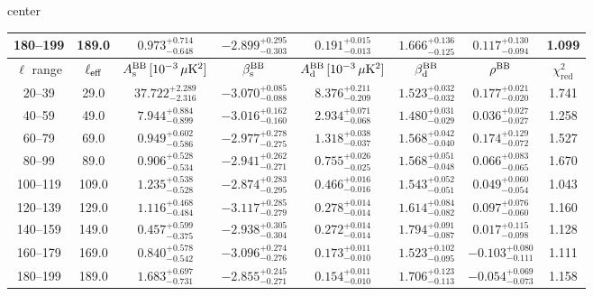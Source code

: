 \begin{table}[h]
\begin{adjustbox}{center}
\begin{tabular}{cccccccc}
180--199 & 189.0 & $0.973^{+0.714}_{-0.648}$ & $-2.899^{+0.295}_{-0.303}$ & $0.191^{+0.015}_{-0.013}$ & $1.666^{+0.136}_{-0.125}$ & $0.117^{+0.130}_{-0.094}$ & 1.099 \\
\midrule
$\ell$ range & $\ell_{\rm eff}$ & $A^{\rm BB}_{\rm s}\,[10^{-3}\,\mu\mathrm{K}^2]$ & $\beta^{\rm BB}_{\rm s}$ & $A^{\rm BB}_{\rm d}\,[10^{-3}\,\mu\mathrm{K}^2]$ & $\beta^{\rm BB}_{\rm d}$ & $\rho^{\rm BB}$ & $\chi^2_\mathrm{red}$ \\
\midrule
20--39 & 29.0 & $37.722^{+2.289}_{-2.316}$ & $-3.070^{+0.085}_{-0.088}$ & $8.376^{+0.211}_{-0.209}$ & $1.523^{+0.032}_{-0.032}$ & $0.177^{+0.021}_{-0.020}$ & 1.741 \\
40--59 & 49.0 & $7.944^{+0.884}_{-0.899}$ & $-3.016^{+0.162}_{-0.160}$ & $2.934^{+0.071}_{-0.068}$ & $1.480^{+0.031}_{-0.029}$ & $0.036^{+0.027}_{-0.027}$ & 1.258 \\
60--79 & 69.0 & $0.949^{+0.602}_{-0.586}$ & $-2.977^{+0.278}_{-0.275}$ & $1.318^{+0.038}_{-0.037}$ & $1.568^{+0.042}_{-0.040}$ & $0.174^{+0.129}_{-0.072}$ & 1.527 \\
80--99 & 89.0 & $0.906^{+0.528}_{-0.534}$ & $-2.941^{+0.262}_{-0.271}$ & $0.755^{+0.026}_{-0.025}$ & $1.568^{+0.051}_{-0.048}$ & $0.066^{+0.083}_{-0.065}$ & 1.670 \\
100--119 & 109.0 & $1.235^{+0.538}_{-0.528}$ & $-2.874^{+0.283}_{-0.295}$ & $0.466^{+0.016}_{-0.016}$ & $1.543^{+0.052}_{-0.051}$ & $0.049^{+0.060}_{-0.054}$ & 1.043 \\
120--139 & 129.0 & $1.116^{+0.468}_{-0.484}$ & $-3.117^{+0.285}_{-0.279}$ & $0.278^{+0.014}_{-0.014}$ & $1.614^{+0.084}_{-0.082}$ & $0.097^{+0.076}_{-0.060}$ & 1.160 \\
140--159 & 149.0 & $0.457^{+0.599}_{-0.375}$ & $-2.938^{+0.305}_{-0.304}$ & $0.272^{+0.014}_{-0.014}$ & $1.794^{+0.091}_{-0.087}$ & $0.017^{+0.115}_{-0.098}$ & 1.128 \\
160--179 & 169.0 & $0.840^{+0.578}_{-0.542}$ & $-3.096^{+0.274}_{-0.276}$ & $0.173^{+0.011}_{-0.010}$ & $1.523^{+0.102}_{-0.095}$ & $-0.103^{+0.080}_{-0.111}$ & 1.111 \\
180--199 & 189.0 & $1.683^{+0.697}_{-0.731}$ & $-2.855^{+0.245}_{-0.271}$ & $0.154^{+0.011}_{-0.010}$ & $1.706^{+0.123}_{-0.113}$ & $-0.054^{+0.069}_{-0.073}$ & 1.158 \\
\bottomrule
\end{tabular}
\end{adjustbox}
\end{table}
